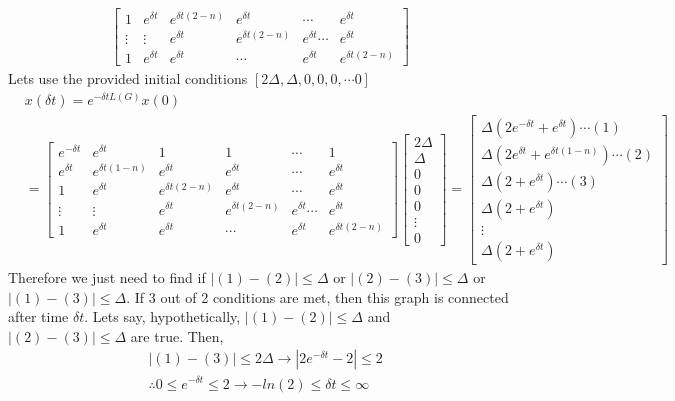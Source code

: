 \documentclass{article}
\begin{document}
\begin{problem}
\begin{align*}
\begin{bmatrix*}
             1 & e^{\delta t } & e^{\delta t  (2-n)} & e^{\delta t } & \cdots & e^{\delta t } \\
             \vdots & \vdots & e^{\delta t }&e^{\delta t  (2-n)} &e^{\delta t } \cdots &e^{\delta t }\\
             1& e^{\delta t }&e^{\delta t }&\cdots &e^{\delta t }&e^{\delta t  (2-n)}
        \end{bmatrix*}
    \end{align*}
    Lets use the provided initial conditions $[2\Delta, \Delta, 0, 0, 0, \cdots 0]$ 
    \begin{align*}
        &x(\delta t) = e^{-\delta t L(G)}  x(0) \\
        &= \begin{bmatrix*}
            e^{-\delta t } & e^{\delta t } & 1 & 1 & \cdots &1 \\
            e^{\delta t } & e^{\delta t (1-n)} & e^{\delta t } & e^{\delta t } & \cdots & e^{\delta t }\\
             1 & e^{\delta t } & e^{\delta t  (2-n)} & e^{\delta t } & \cdots & e^{\delta t } \\
             \vdots & \vdots & e^{\delta t }&e^{\delta t  (2-n)} &e^{\delta t } \cdots &e^{\delta t }\\
             1& e^{\delta t }&e^{\delta t }&\cdots &e^{\delta t }&e^{\delta t  (2-n)}
        \end{bmatrix*}
        \begin{bmatrix*}
            2\Delta \\ \Delta \\ 0 \\ 0 \\ 0 \\ \vdots \\ 0
        \end{bmatrix*}
        = \begin{bmatrix*}
            \Delta (2 e^{-\delta t} + e^{\delta t}) \cdots (1)\\
            \Delta (2 e^{\delta t} + e^{\delta t  (1-n)}) \cdots (2)\\
            \Delta (2 + e^{\delta t}) \cdots (3)\\
            \Delta (2 + e^{\delta t})\\ 
            \vdots \\
            \Delta (2 + e^{\delta t})
        \end{bmatrix*} 
    \end{align*}
    Therefore we just need to find if $|(1) - (2)| \leq \Delta$ or $|(2) - (3)| \leq \Delta$ or $|(1) - (3)| \leq \Delta$. If 3 out of 2 conditions are met, then this graph is connected after time $\delta t$. Lets say, hypothetically, $|(1) - (2)| \leq \Delta$ and $|(2) - (3)| \leq \Delta$ are true. Then, 
    \begin{align*}
        &|(1) - (3)| \leq 2\Delta \rightarrow |2e^{-\delta t} -2| \leq 2\\
        &\therefore 0 \leq e^{-\delta t} \leq 2 \rightarrow -ln(2) \leq \delta t \leq \infty 
    \end{align*}
\end{problem}
\end{document}
